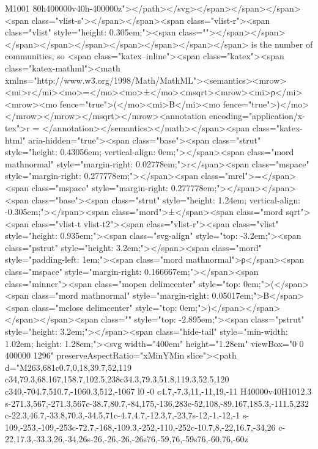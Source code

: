 M1001 80h400000v40h-400000z"></path></svg></span></span></span><span class="vlist-s">​</span></span><span class="vlist-r"><span class="vlist" style="height: 0.305em;"><span class=""></span></span></span></span></span></span></span></span></span> is the number of communities, so <span class="katex--inline"><span class="katex"><span class="katex-mathml"><math xmlns="http://www.w3.org/1998/Math/MathML"><semantics><mrow><mi>r</mi><mo>=</mo><mo>±</mo><msqrt><mrow><mi>ρ</mi><mrow><mo fence="true">(</mo><mi>B</mi><mo fence="true">)</mo></mrow></mrow></msqrt></mrow><annotation encoding="application/x-tex">r = \pm {}</annotation></semantics></math></span><span class="katex-html" aria-hidden="true"><span class="base"><span class="strut" style="height: 0.43056em; vertical-align: 0em;"></span><span class="mord mathnormal" style="margin-right: 0.02778em;">r</span><span class="mspace" style="margin-right: 0.277778em;"></span><span class="mrel">=</span><span class="mspace" style="margin-right: 0.277778em;"></span></span><span class="base"><span class="strut" style="height: 1.24em; vertical-align: -0.305em;"></span><span class="mord">±</span><span class="mord sqrt"><span class="vlist-t vlist-t2"><span class="vlist-r"><span class="vlist" style="height: 0.935em;"><span class="svg-align" style="top: -3.2em;"><span class="pstrut" style="height: 3.2em;"></span><span class="mord" style="padding-left: 1em;"><span class="mord mathnormal">ρ</span><span class="mspace" style="margin-right: 0.166667em;"></span><span class="minner"><span class="mopen delimcenter" style="top: 0em;">(</span><span class="mord mathnormal" style="margin-right: 0.05017em;">B</span><span class="mclose delimcenter" style="top: 0em;">)</span></span></span></span><span class="" style="top: -2.895em;"><span class="pstrut" style="height: 3.2em;"></span><span class="hide-tail" style="min-width: 1.02em; height: 1.28em;"><svg width="400em" height="1.28em" viewBox="0 0 400000 1296" preserveAspectRatio="xMinYMin slice"><path d="M263,681c0.7,0,18,39.7,52,119
c34,79.3,68.167,158.7,102.5,238c34.3,79.3,51.8,119.3,52.5,120
c340,-704.7,510.7,-1060.3,512,-1067
l0 -0
c4.7,-7.3,11,-11,19,-11
H40000v40H1012.3
s-271.3,567,-271.3,567c-38.7,80.7,-84,175,-136,283c-52,108,-89.167,185.3,-111.5,232
c-22.3,46.7,-33.8,70.3,-34.5,71c-4.7,4.7,-12.3,7,-23,7s-12,-1,-12,-1
s-109,-253,-109,-253c-72.7,-168,-109.3,-252,-110,-252c-10.7,8,-22,16.7,-34,26
c-22,17.3,-33.3,26,-34,26s-26,-26,-26,-26s76,-59,76,-59s76,-60,76,-60z
